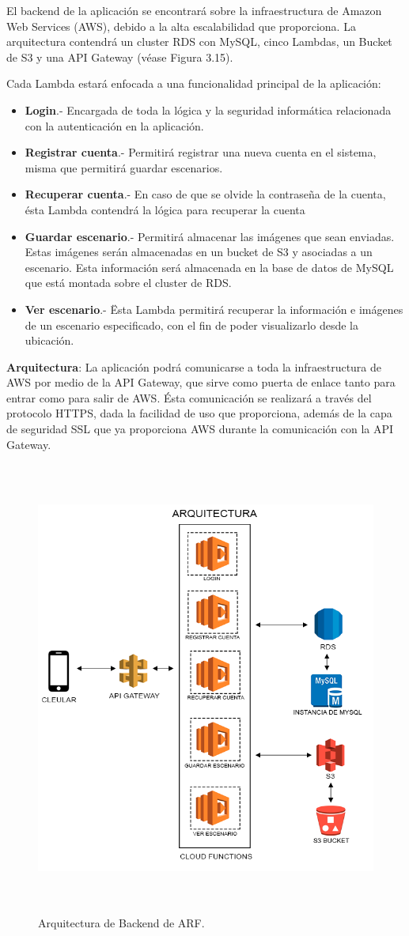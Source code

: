 El backend de la aplicación se encontrará sobre la infraestructura de Amazon Web Services (AWS), debido a la alta escalabilidad que proporciona. La arquitectura contendrá un cluster RDS con MySQL, cinco Lambdas, un Bucket de S3 y una API Gateway (véase Figura 3.15).\par
Cada Lambda estará enfocada a una funcionalidad principal de la aplicación:\par
\begin{itemize}
	\item\textbf{Login}.- Encargada de toda la lógica y la seguridad informática relacionada con la autenticación en la aplicación.
	\item\textbf{Registrar cuenta}.- Permitirá registrar una nueva cuenta en el sistema, misma que permitirá guardar escenarios.
	\item\textbf{Recuperar cuenta}.- En caso de que se olvide la contraseña de la cuenta, ésta Lambda contendrá la lógica para recuperar la cuenta
	\item\textbf{Guardar escenario}.- Permitirá almacenar las imágenes que sean enviadas. Estas imágenes serán almacenadas en un bucket de S3 y asociadas a un escenario. Esta información será almacenada en la base de datos de MySQL que está montada sobre el cluster de RDS.
	\item\textbf{Ver escenario}.- Ësta Lambda permitirá recuperar la información e imágenes de un escenario especificado, con el fin de poder visualizarlo desde la ubicación.
\end{itemize}
\noindent
\textbf{Arquitectura}:
La aplicación podrá comunicarse a toda la infraestructura de AWS por medio de la API Gateway, que sirve como puerta de enlace tanto para entrar como para salir de AWS. Ésta comunicación se realizará a través del protocolo HTTPS, dada la facilidad de uso que proporciona, además de la capa de seguridad SSL que ya proporciona AWS durante la comunicación con la API Gateway.
\begin{figure}[h!]
	\centering
	\includegraphics[width=15cm,height=15cm]{imagenes/desarrollo/arquitectura/ArchitecturaBackend.png}
	\caption{Arquitectura de Backend de ARF.}
	\label{fig:arqbackend}
\end{figure}


